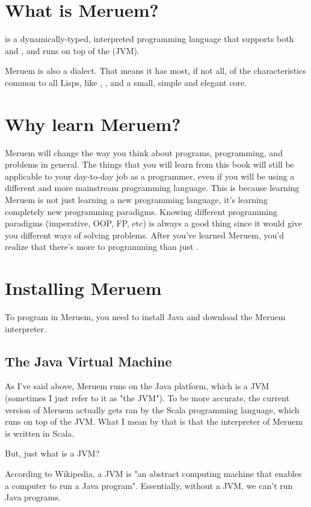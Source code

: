 \section{What is Meruem?}
 is a dynamically-typed, interpreted programming language that supports both  and , and runs on top of the (JVM).

Meruem is also a  dialect. That means it has most, if not all, of the characteristics common to all Lisps, like , , and a small, simple and elegant core.

\section{Why learn Meruem?}
Meruem will change the way you think about programs, programming, and problems in general. The things that you will learn from this book will still be applicable to your day-to-day job as a programmer, even if you will be using a different and more mainstream programming language. This is because learning Meruem is not just learning a new programming language, it's learning completely new programming paradigms. Knowing different programming paradigms (imperative, OOP, FP, etc) is always a good thing since it would give you different ways of solving problems. After you've learned Meruem, you'd realize that there's more to programming than just .

\section{Installing Meruem}
To program in Meruem, you need to install Java and download the Meruem interpreter.

\subsection{The Java Virtual Machine}
As I've said above, Meruem runs on the Java platform, which is a JVM (sometimes I just refer to it as "the JVM"). To be more accurate, the current version of Meruem actually gets ran by the Scala programming language, which runs on top of the JVM. What I mean by that is that the interpreter of Meruem is written in Scala. 

But, just what is a JVM? 

According to Wikipedia, a JVM is "an abstract computing machine that enables a computer to run a Java program". Essentially, without a JVM, we can't run Java programs. 

